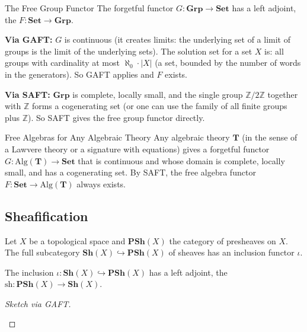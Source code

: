 \begin{example}{The Free Group Functor}
The forgetful functor $G : \mathbf{Grp} \to \mathbf{Set}$ has a left
adjoint, the  $F : \mathbf{Set} \to \mathbf{Grp}$.

\textbf{Via GAFT:} $G$ is continuous (it creates limits: the underlying
set of a limit of groups is the limit of the underlying sets). The
solution set for a set $X$ is: all groups with cardinality at most
$\aleph_0 \cdot |X|$ (a set, bounded by the number of words in the
generators). So GAFT applies and $F$ exists.

\textbf{Via SAFT:} $\mathbf{Grp}$ is complete, locally small, and the
single group $\mathbb{Z}/2\mathbb{Z}$ together with $\mathbb{Z}$ forms a
cogenerating set (or one can use the family of all finite groups plus
$\mathbb{Z}$). So SAFT gives the free group functor directly.
\end{example}

\begin{example}{Free Algebras for Any Algebraic Theory}
Any algebraic theory $\mathbf{T}$ (in the sense of a Lawvere theory or
a signature with equations) gives a forgetful functor $G: \mathrm{Alg}(\mathbf{T})
\to \mathbf{Set}$ that is continuous and whose domain is complete, locally
small, and has a cogenerating set. By SAFT, the free algebra functor
$F: \mathbf{Set} \to \mathrm{Alg}(\mathbf{T})$ always exists.
\end{example}

\subsection{Sheafification}

Let $X$ be a topological space and $\mathbf{PSh}(X)$ the category of
presheaves on $X$. The full subcategory $\mathbf{Sh}(X) \hookrightarrow
\mathbf{PSh}(X)$ of sheaves has an inclusion functor $\iota$.

\begin{theorem}
The inclusion $\iota : \mathbf{Sh}(X) \hookrightarrow \mathbf{PSh}(X)$
has a left adjoint, the 
$\mathrm{sh}: \mathbf{PSh}(X) \to \mathbf{Sh}(X)$.
\end{theorem}

\begin{proof}[Sketch via GAFT]
\begin{prooflog}
\end{prooflog}
\end{proof}

